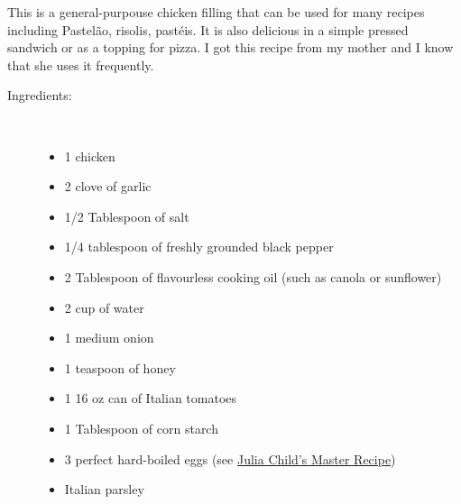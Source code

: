 \documentclass[11pt,letterpaper]{article}
\begin{document}


This is a general-purpouse chicken filling that can be used for many recipes including Pastel\~ao, risolis, past\'eis. It is also delicious in a simple pressed sandwich or as a topping for pizza. I got this recipe from my mother and I know that she uses it frequently. 
 
\begin{description}

\item[Ingredients:]\ \\
	\begin{itemize}
	\item 1 chicken
	\item 2 clove of garlic
	\item 1/2 Tablespoon of salt
	\item 1/4 tablespoon of freshly grounded black pepper
        \item 2 Tablespoon of flavourless cooking oil (such as canola or sunflower)
        \item 2 cup of water
        \item 1 medium onion
        \item 1 teaspoon of honey
	\item 1 16 oz can of Italian tomatoes
	\item 1 Tablespoon of corn starch
	\item 3 perfect hard-boiled eggs (see \href{HardBoiledEggs.html}{Julia Child's Master Recipe})
        \item Italian parsley
	\end{itemize}


\end{description}
\end{document}
